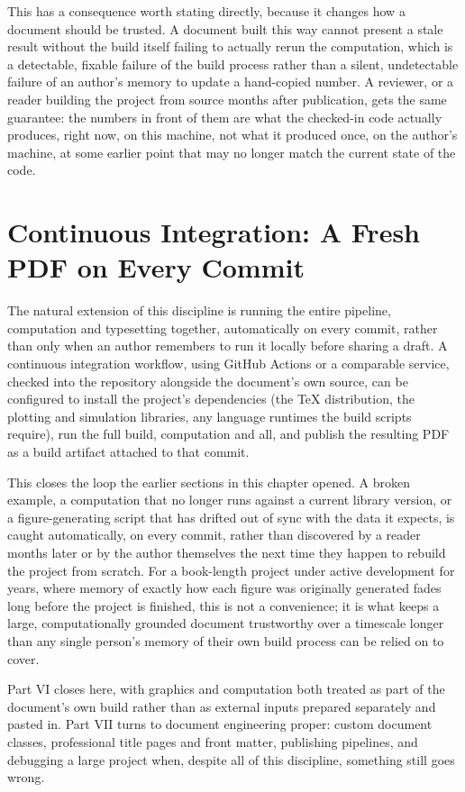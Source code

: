 This has a consequence worth stating directly, because it changes how a document should be trusted. A document built this way cannot present a stale result without the build itself failing to actually rerun the computation, which is a detectable, fixable failure of the build process rather than a silent, undetectable failure of an author's memory to update a hand-copied number. A reviewer, or a reader building the project from source months after publication, gets the same guarantee: the numbers in front of them are what the checked-in code actually produces, right now, on this machine, not what it produced once, on the author's machine, at some earlier point that may no longer match the current state of the code.

\hypertarget{continuous-integration-a-fresh-pdf-on-every-commit}{%
\section{Continuous Integration: A Fresh PDF on Every Commit}\label{continuous-integration-a-fresh-pdf-on-every-commit}}

The natural extension of this discipline is running the entire pipeline, computation and typesetting together, automatically on every commit, rather than only when an author remembers to run it locally before sharing a draft. A continuous integration workflow, using GitHub Actions or a comparable service, checked into the repository alongside the document's own source, can be configured to install the project's dependencies (the TeX distribution, the plotting and simulation libraries, any language runtimes the build scripts require), run the full build, computation and all, and publish the resulting PDF as a build artifact attached to that commit.

This closes the loop the earlier sections in this chapter opened. A broken example, a computation that no longer runs against a current library version, or a figure-generating script that has drifted out of sync with the data it expects, is caught automatically, on every commit, rather than discovered by a reader months later or by the author themselves the next time they happen to rebuild the project from scratch. For a book-length project under active development for years, where memory of exactly how each figure was originally generated fades long before the project is finished, this is not a convenience; it is what keeps a large, computationally grounded document trustworthy over a timescale longer than any single person's memory of their own build process can be relied on to cover.

Part VI closes here, with graphics and computation both treated as part of the document's own build rather than as external inputs prepared separately and pasted in. Part VII turns to document engineering proper: custom document classes, professional title pages and front matter, publishing pipelines, and debugging a large project when, despite all of this discipline, something still goes wrong.
